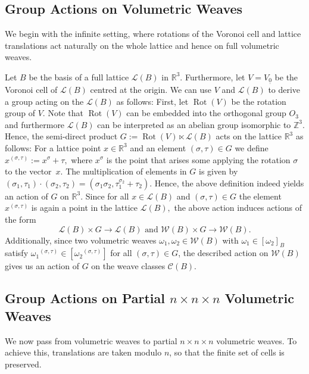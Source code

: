 \documentclass[12pt]{article}
\theoremstyle{definition}
\theoremstyle{remark}
\DeclareMathOperator{\Rot}{Rot}
\begin{document}
\subsection{Group Actions on Volumetric Weaves}

We begin with the infinite setting, where rotations of the Voronoi cell and lattice translations act naturally on the whole lattice and hence on full volumetric weaves.


Let $B$ be the basis of a full lattice $\mathcal{L}(B)$ in $\mathbb{R}^3$.
Furthermore, let $V=V_{\underline{0}}$ be the Voronoi cell of $\mathcal{L}(B)$ centred at the origin.  We can use $V$ and $\mathcal{L}(B)$ to derive a group acting on the $\mathcal{L}(B)$ as follows: First, let $\Rot(V)$ be the rotation group of $V$. Note that $\Rot(V)$ can be embedded into the orthogonal group $O_3$ and furthermore $\mathcal{L}(B)$ can be interpreted as an abelian group isomorphic to $\mathbb{Z}^3$. Hence, the semi-direct product $G:=\Rot(V)\ltimes \mathcal{L}(B)$ acts on the lattice $\mathbb{R}^3$ as follows:
For a lattice point $x\in \mathbb{R}^3$ and an element $(\sigma,\tau)\in G$ we define $x^{(\sigma,\tau)}:={x^{\sigma}}+\tau,$ where $x^\sigma$ is the point that arises some applying the rotation $\sigma$ to the vector~$x.$
The multiplication of elements in $G$ is given by $(\sigma_1,\tau_1)\cdot(\sigma_2,\tau_2)=(\sigma_1\sigma_2,\tau_1^{\sigma_2}+\tau_2). $ Hence, the above definition indeed yields an action of $G$ on $\mathbb{R}^3.$
Since for all $x \in \mathcal{L}(B)$ and $(\sigma,\tau)\in G$ the element $x^{(\sigma,\tau)}$ is again a point in the lattice $\mathcal{L}(B),$ the above action induces actions of the form
\[
\mathcal{L}(B)\times G\to \mathcal{L}(B) \text{ and } \mathcal{W}(B)\times G\to \mathcal{W}(B).
\]
Additionally, since two volumetric weaves $\omega_1,\omega_2\in \mathcal{W}(B)$ with $\omega_1\in [\omega_2]_B$
satisfy ${\omega_1}^{(\sigma,\tau)}\in [{\omega_2}^{(\sigma,\tau)} ]$ for all $(\sigma,\tau)\in G$, the described action on $\mathcal{W}(B)$ gives us an action of $G$ on the weave classes $\mathcal{C}(B).$
\subsection{Group Actions on Partial $n\times n\times n$ Volumetric Weaves}
\label{section:action}

We now pass from volumetric weaves to partial $n\times n\times n$ volumetric weaves. To achieve this, translations are taken modulo $n$, so that the finite set of cells is preserved.
\end{document}
